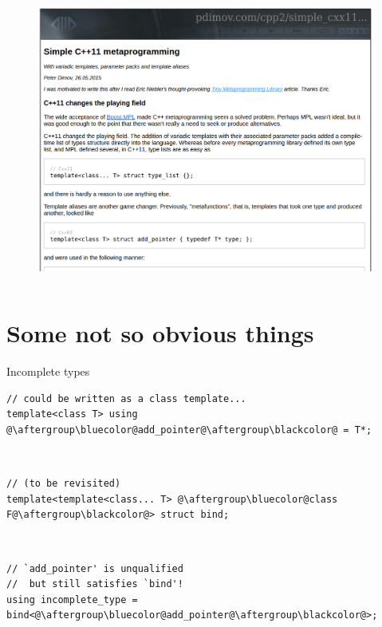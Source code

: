 \documentclass[xcolor=dvipsnames]{beamer}
\begin{document}
\begin{frame}[plain]
  \begin{columns}[T] %
    \begin{column}{0.9\textwidth}
      \begin{figure}[H]
        \centering
        \includegraphics[width=0.99\textwidth]{pdimov}
      \end{figure}
    \end{column}%
  \end{columns}
\end{frame}


\section{Some not so obvious things}

\begin{frame}[fragile]{Incomplete types}
\begin{lstlisting}
// could be written as a class template...
template<class T> using @\aftergroup\bluecolor@add_pointer@\aftergroup\blackcolor@ = T*;
\end{lstlisting}

~

\begin{lstlisting}
// (to be revisited)
template<template<class... T> @\aftergroup\bluecolor@class F@\aftergroup\blackcolor@> struct bind;
\end{lstlisting}

~

\begin{lstlisting}
// `add_pointer' is unqualified
//  but still satisfies `bind'!
using incomplete_type = bind<@\aftergroup\bluecolor@add_pointer@\aftergroup\blackcolor@>;
\end{lstlisting}
\end{frame}
\end{document}
